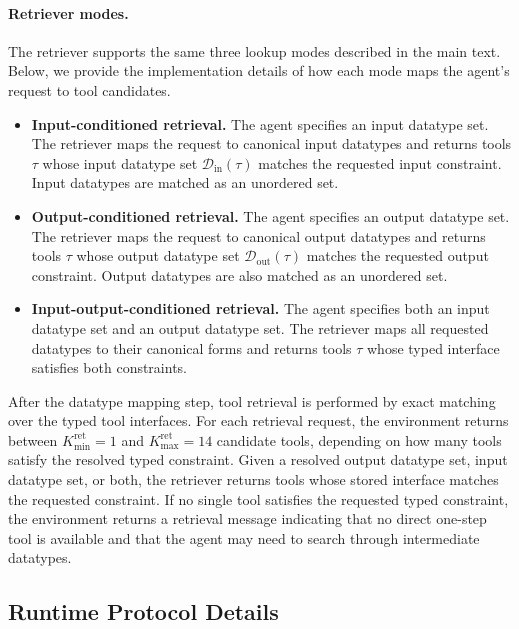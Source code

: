 \documentclass{llmxive}
\begin{document}
\paragraph{Retriever modes.}
The retriever supports the same three lookup modes described in the main text. 
Below, we provide the implementation details of how each mode maps the agent's request to tool candidates.
\begin{itemize}
    \item \textbf{Input-conditioned retrieval.} The agent specifies an input datatype set. The retriever maps the request to canonical input datatypes and returns tools $\tau$ whose input datatype set $\mathcal{D}_{\mathrm{in}}(\tau)$ matches the requested input constraint. Input datatypes are matched as an unordered set.
    \item \textbf{Output-conditioned retrieval.} The agent specifies an output datatype set. The retriever maps the request to canonical output datatypes and returns tools $\tau$ whose output datatype set $\mathcal{D}_{\mathrm{out}}(\tau)$ matches the requested output constraint. Output datatypes are also matched as an unordered set.
    \item \textbf{Input-output-conditioned retrieval.} The agent specifies both an input datatype set and an output datatype set. The retriever maps all requested datatypes to their canonical forms and returns tools $\tau$ whose typed interface satisfies both constraints.
\end{itemize}

After the datatype mapping step, tool retrieval is performed by exact matching over the typed tool interfaces. 
For each retrieval request, the environment returns between $K_{\min}^{\mathrm{ret}}=1$ and $K_{\max}^{\mathrm{ret}}=14$ candidate tools, depending on how many tools satisfy the resolved typed constraint.
Given a resolved output datatype set, input datatype set, or both, the retriever returns tools whose stored interface matches the requested constraint.
If no single tool satisfies the requested typed constraint, the environment returns a retrieval message indicating that no direct one-step tool is available and that the agent may need to search through intermediate datatypes.

\subsection{Runtime Protocol Details}
\label{app:runtime-interaction-details}
\end{document}
